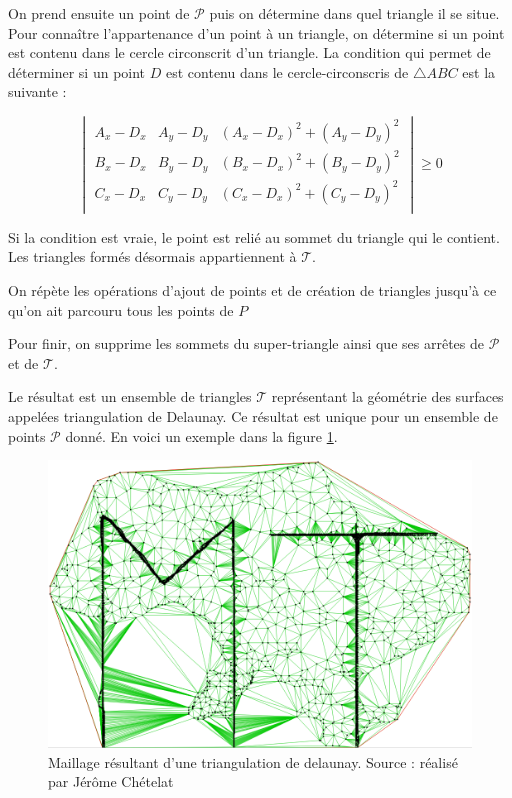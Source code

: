 On prend ensuite un point de $\mathcal{P}$ puis on détermine dans quel triangle il se situe.
Pour connaître l'appartenance d'un point à un triangle, on détermine si un point est contenu dans le cercle circonscrit d'un triangle.
La condition qui permet de déterminer si un point $D$ est contenu dans le cercle-circonscris de $\triangle ABC$ est la suivante :

$$
\begin{vmatrix}
 A_x - D_x & A_y - D_y & (A_x - D_x)^2 + (A_y - D_y)^2 \\
 B_x - D_x & B_y - D_y & (B_x - D_x)^2 + (B_y - D_y)^2 \\
 C_x - D_x & C_y - D_y & (C_x - D_x)^2 + (C_y - D_y)^2 \\
\end{vmatrix} \geqslant 0
$$

Si la condition est vraie, le point est relié au sommet du triangle qui le contient. Les triangles formés désormais appartiennent à $\mathcal{T}$.

On répète les opérations d'ajout de points et de création de triangles jusqu'à ce qu'on ait parcouru tous les points de $P$

Pour finir, on supprime les sommets du super-triangle ainsi que ses arrêtes de $\mathcal{P}$ et de $\mathcal{T}$.

Le résultat est un ensemble de triangles $\mathcal{T}$ représentant la géométrie des surfaces appelées triangulation de Delaunay.
Ce résultat est unique pour un ensemble de points $\mathcal{P}$ donné.
En voici un exemple dans la figure \ref{fig:example_delaunay}.


\begin{figure}[htbp!]
    \centering
    \includegraphics[width=0.8\linewidth]{figures/example_delaunay.png}
    \caption{Maillage résultant d'une triangulation de delaunay. Source : réalisé par Jérôme Chételat}
    \label{fig:example_delaunay}
\end{figure}

